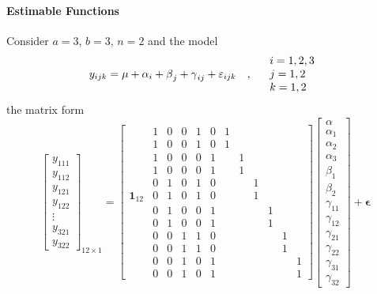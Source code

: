 \documentclass{article}
\begin{document}
\bigskip

\paragraph{Estimable Functions}

Consider $a=3$, $b=3$, $n=2$ and the model%
\begin{equation*}
y_{ijk}=\mu +\alpha _{i}+\beta _{j}+\gamma _{ij}+\varepsilon _{ijk}\quad
,\quad 
\begin{tabular}{l}
$i=1,2,3$ \\ 
$j=1,2$ \\ 
$k=1,2$%
\end{tabular}%
\end{equation*}%
the matrix form%
\begin{equation*}
\left[ 
\begin{array}{c}
y_{111} \\ 
y_{112} \\ 
y_{121} \\ 
y_{122} \\ 
\vdots  \\ 
y_{321} \\ 
y_{322}%
\end{array}%
\right] _{12\times 1}=\left[ 
\begin{array}{cccccccccccc}
& 1 & 0 & 0 & 1 & 0 & 1 &  &  &  &  &  \\ 
& 1 & 0 & 0 & 1 & 0 & 1 &  &  &  &  &  \\ 
& 1 & 0 & 0 & 0 & 1 &  & 1 &  &  &  &  \\ 
& 1 & 0 & 0 & 0 & 1 &  & 1 &  &  &  &  \\ 
& 0 & 1 & 0 & 1 & 0 &  &  & 1 &  &  &  \\ 
\mathbf{1}_{12} & 0 & 1 & 0 & 1 & 0 &  &  & 1 &  &  &  \\ 
& 0 & 1 & 0 & 0 & 1 &  &  &  & 1 &  &  \\ 
& 0 & 1 & 0 & 0 & 1 &  &  &  & 1 &  &  \\ 
& 0 & 0 & 1 & 1 & 0 &  &  &  &  & 1 &  \\ 
& 0 & 0 & 1 & 1 & 0 &  &  &  &  & 1 &  \\ 
& 0 & 0 & 1 & 0 & 1 &  &  &  &  &  & 1 \\ 
& 0 & 0 & 1 & 0 & 1 &  &  &  &  &  & 1%
\end{array}%
\right] \left[ 
\begin{array}{c}
\alpha  \\ 
\alpha _{1} \\ 
\alpha _{2} \\ 
\alpha _{3} \\ 
\beta _{1} \\ 
\beta _{2} \\ 
\gamma _{11} \\ 
\gamma _{12} \\ 
\gamma _{21} \\ 
\gamma _{22} \\ 
\gamma _{31} \\ 
\gamma _{32}%
\end{array}%
\right] +\mathbf{\epsilon }
\end{equation*}%
\end{document}
